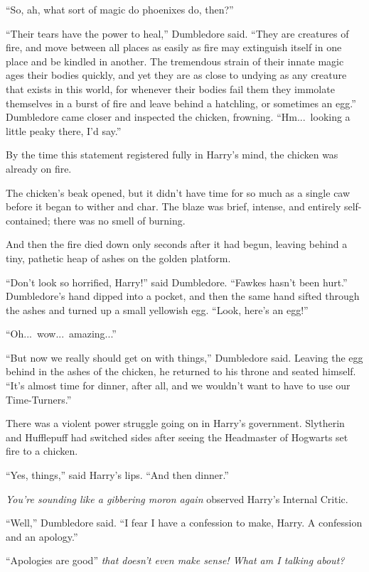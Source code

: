 “So, ah, what sort of magic do phoenixes do, then?”

“Their tears have the power to heal,” Dumbledore said. “They are creatures of fire, and move between all places as easily as fire may extinguish itself in one place and be kindled in another. The tremendous strain of their innate magic ages their bodies quickly, and yet they are as close to undying as any creature that exists in this world, for whenever their bodies fail them they immolate themselves in a burst of fire and leave behind a hatchling, or sometimes an egg.” Dumbledore came closer and inspected the chicken, frowning. “Hm...\ looking a little peaky there, I’d say.”

By the time this statement registered fully in Harry’s mind, the chicken was already on fire.

The chicken’s beak opened, but it didn’t have time for so much as a single caw before it began to wither and char. The blaze was brief, intense, and entirely self-contained; there was no smell of burning.

And then the fire died down only seconds after it had begun, leaving behind a tiny, pathetic heap of ashes on the golden platform.

“Don’t look so horrified, Harry!” said Dumbledore. “Fawkes hasn’t been hurt.” Dumbledore’s hand dipped into a pocket, and then the same hand sifted through the ashes and turned up a small yellowish egg. “Look, here’s an egg!”

“Oh...\ wow...\ amazing...”

“But now we really should get on with things,” Dumbledore said. Leaving the egg behind in the ashes of the chicken, he returned to his throne and seated himself. “It’s almost time for dinner, after all, and we wouldn’t want to have to use our Time-Turners.”

There was a violent power struggle going on in Harry’s government. Slytherin and Hufflepuff had switched sides after seeing the Headmaster of Hogwarts set fire to a chicken.

“Yes, things,” said Harry’s lips. “And then dinner.”

\emph{You’re sounding like a gibbering moron again} observed Harry’s Internal Critic.

“Well,” Dumbledore said. “I fear I have a confession to make, Harry. A confession and an apology.”

“Apologies are good” \emph{that doesn’t even make sense! What am I talking about?}

